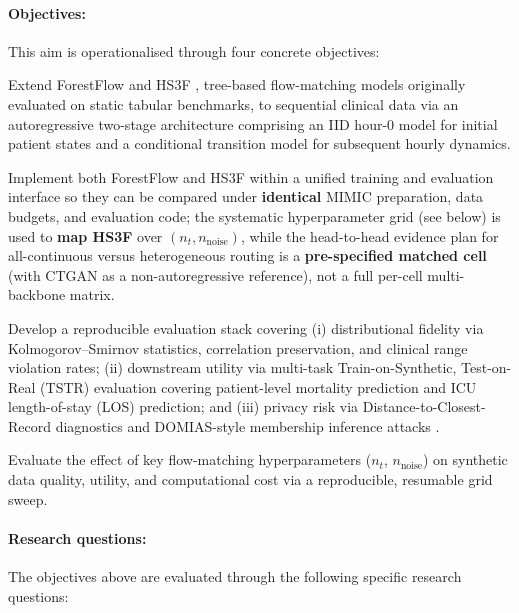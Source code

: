 \documentclass[11pt]{informatics-report}
\begin{document}
\paragraph{Objectives:}
This aim is operationalised through four concrete objectives:

\begin{description}[leftmargin=0cm,labelsep=0.6em]
    \item[Domain adaptation:] Extend ForestFlow \cite{jolicoeur2023forest} and HS3F \cite{akazan2024hs3f}, tree-based flow-matching models originally evaluated on static tabular benchmarks, to sequential clinical data via an autoregressive two-stage architecture comprising an IID hour-0 model for initial patient states and a conditional transition model for subsequent hourly dynamics.
    \item[Backbone implementation and comparison:] Implement both ForestFlow and HS3F within a unified training and evaluation interface so they can be compared under \textbf{identical} MIMIC preparation, data budgets, and evaluation code; the systematic hyperparameter grid (see below) is used to \textbf{map HS3F} over $(n_t, n_{\text{noise}})$, while the head-to-head evidence plan for all-continuous versus heterogeneous routing is a \textbf{pre-specified matched cell} (with CTGAN as a non-autoregressive reference), not a full per-cell multi-backbone matrix.
    \item[Multi-axis evaluation framework:] Develop a reproducible evaluation stack covering (i) distributional fidelity via Kolmogorov--Smirnov statistics, correlation preservation, and clinical range violation rates; (ii) downstream utility via multi-task Train-on-Synthetic, Test-on-Real (TSTR) evaluation covering patient-level mortality prediction and ICU length-of-stay (LOS) prediction; and (iii) privacy risk via Distance-to-Closest-Record diagnostics and DOMIAS-style membership inference attacks \cite{breugel2023domias}.
    \item[Systematic hyperparameter investigation:] Evaluate the effect of key flow-matching hyperparameters ($n_t$, $n_{\text{noise}}$) on synthetic data quality, utility, and computational cost via a reproducible, resumable grid sweep.
\end{description}

\paragraph{Research questions:}
The objectives above are evaluated through the following specific research questions:
\end{document}
